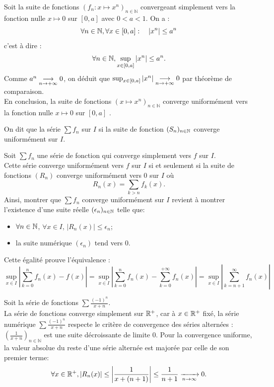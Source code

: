 \documentclass{book}
\newcommand{\Sfn}{\sum f_n}
\begin{document}
\begin{Exemple}[Méthode 2]
Soit la suite de fonctions $(f_n:x\mapsto x^n)_{n\in \mathbb{N}}$ convergeant simplement vers la fonction nulle $x\mapsto 0$ sur $[0,a]$ avec $0<a<1$. On a :
$$\forall n\in \mathbb{N}, \forall x\in[0,a]:\quad |x^n|\leq a^n$$ c'est à dire :
$$ \forall n\in \mathbb{N}, \sup_{x\in[0,a]}|x^n|\leq a^n.$$
Comme $a^n\tend[n\to+\infty]0$, on déduit que $\sup_{x\in[0,a]}|x^n| \tend[n\to+\infty]0$ par théorème de comparaison. \\
En conclusion, la suite de fonctions $(x\mapsto x^n)_{n\in \mathbb{N}}$ converge uniformément vers la fonction nulle $x\mapsto 0$ sur $[0,a]$ .
\end{Exemple}


\begin{Definition}[Convergence uniforme $\Sfn$]
On dit que la série $\Sfn$  sur $I$ si  la suite de fonction $(S_n)_{n\in \mathbb{N}   }$ converge uniformément sur $I$.
\end{Definition}
\begin{Proposition}
Soit $\Sfn$ une série de fonction qui converge simplement vers $f$ sur $I$.\\
Cette série converge uniformément vers $f$ sur $I$ si et seulement si
la suite de fonctions $(R_n)$ converge uniformément vers $0$ sur $I$
où \[ R_n(x) = \sum _{k>n} f_k(x). \]
Ainsi, montrer que $\Sfn$ converge uniformément sur $I$ revient à montrer
l'existence d'une suite réelle $(\epsilon_n)_{n\in \mathbb{N}   }$ telle que:
  \begin{itemize}
  \item
    $\forall  n\in \mathbb{N}   $, $\forall  x\in I$, $\left|R_n(x)\right| \leq \epsilon_n$;
  \item
    la suite numérique $(\epsilon_n)$ tend vers $0$.
  \end{itemize}
\end{Proposition}
\begin{Demonstration}
Cette égalité prouve l'équivalence :
 $$ \sup_{x\in I}\left|\sum_{k=0}^{n} f_n(x) - f(x)\right| = \sup_{x\in I}\left|\sum_{k=0}^{n} f_n(x) - \sum_{k=0}^{+\infty}f_n(x)\right|=\sup_{x\in I}\left|\sum_{k=n+1}^{\infty} f_n(x)\right|  $$ 
\end{Demonstration}

\begin{Exemple} Soit la série de fonctions $\sum \frac{(-1)^n}{x+n}$.\\
La série de fonctions converge simplement sur $\mathbb{R}^+$, car à $x\in\mathbb{R}^+ $ fixé, la série numérique $\sum \frac{(-1)^n}{x+n}$ respecte le critère de convergence des séries alternées : $(\frac{1}{x+n})_{n\in\mathbb{N}}$ est une suite décroissante de limite 0. Pour la convergence uniforme, la valeur absolue du reste d'une série alternée est majorée par celle de son premier terme:
$$\forall  x\in \mathbb{R} ^+,\left|R_n(x)\right| \leq  \left|\frac{1}{x+(n+1)}\right|\leq \frac{1}{n+1}\xrightarrow[{n\to \infty}]{} 0.$$
\end{Exemple}
% 
\end{document}
